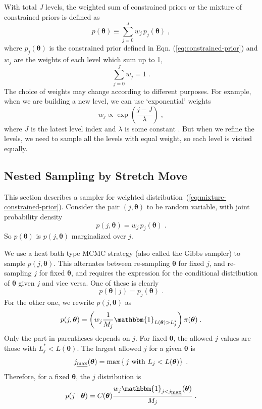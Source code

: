 \documentclass[letterpaper, preprint]{aastex}
\newcommand{\bth} {\boldsymbol \theta}
\begin{document}
With total $J$ levels, the weighted sum of constrained priors or the mixture of constrained priors is defined as
\begin{equation}
p(\bth) \equiv \sum_{j=0}^J w_j\,p_{j}(\bth)\; ,
\label{eq:mixture-constrained-prior}
\end{equation}
where $p_{j}(\bth)$ is the constrained prior defined in Eqn. (\ref{eq:constrained-prior}) and $w_j$ are the weights of each level which sum up to 1,
\begin{equation}
\sum_{j=0}^J w_j = 1\; .
\label{eq:weight-sum-1}
\end{equation}
The choice of weights may change according to different purposes. For example, when we are building a new level, we can use `exponential' weights
\begin{equation}
w_j \propto \exp{\left(\frac{j-J}{\lambda}\right)}\; ,
\end{equation}
where $J$ is the latest level index and $\lambda$ is some constant \citep{brewer11a}. But when we refine the levels, we need to sample all the levels with equal weight, so each level is visited equally.

\subsection{Nested Sampling by Stretch Move}
\label{sec:algorithm}
This section describes a sampler for weighted distribution~(\ref{eq:mixture-constrained-prior}). Consider the pair $(j, \bth)$ to be random variable, with joint probability density
\begin{equation}
p(j,\bth) = w_j\,p_j(\bth)\; .
\label{eq:joint}
\end{equation} 
So $p(\bth)$ is $p(j, \bth)$ marginalized over $j$.

We use a heat bath type MCMC strategy (also called the Gibbs sampler) to sample $p(j, \bth)$. This alternates between re-sampling $\bth$ for fixed $j$, and re-sampling $j$ for fixed $\bth$, and requires the expression for the conditional distribution of $\bth$ given $j$ and vice versa. One of these is clearly
\begin{equation}
p(\bth\mid j)=p_j(\bth)\; .
\label{eq:conditional-theta}
\end{equation}
For the other one, we rewrite $p(j, \bth)$ as
\begin{equation}
p(j, \bth) = \left(w_j\frac{1}{M_j}\mathbbm{1}_{L(\bth)>L^*_j}\right)\pi(\bth)\; .
\end{equation}
Only the part in parentheses depends on $j$. For fixed $\bth$, the allowed $j$ values are those with $L^*_j<L(\bth)$. The largest allowed $j$ for a given $\bth$ is
\begin{equation}
j_{\mbox{\scriptsize \em max}}(\bth) = \max\left\{ \,j \mbox{ with } L_j < L(\bth) \right\} \; .
\end{equation}
Therefore, for a fixed $\bth$, the $j$ distribution is
\begin{equation}
p(j\mid\bth)=C(\bth)\frac{w_j\mathbbm{1}_{j<j_{\mbox{\scriptsize \em max}}}(\bth)}{M_j}\; .
\label{eq:conditional-j}
\end{equation}
\end{document}
